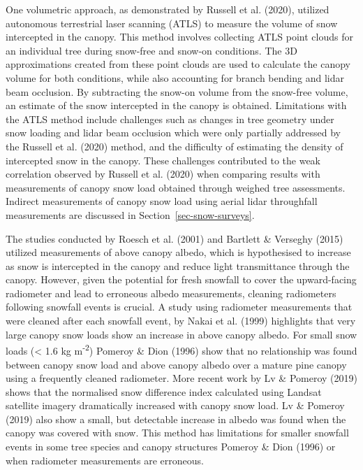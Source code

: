 \documentclass[
  letterpaper,
]{tex/uofsthesis-cs}
\begin{document}
One volumetric approach, as demonstrated by Russell et al. (2020),
utilized autonomous terrestrial laser scanning (ATLS) to measure the
volume of snow intercepted in the canopy. This method involves
collecting ATLS point clouds for an individual tree during snow-free and
snow-on conditions. The 3D approximations created from these point
clouds are used to calculate the canopy volume for both conditions,
while also accounting for branch bending and lidar beam occlusion. By
subtracting the snow-on volume from the snow-free volume, an estimate of
the snow intercepted in the canopy is obtained. Limitations with the
ATLS method include challenges such as changes in tree geometry under
snow loading and lidar beam occlusion which were only partially
addressed by the Russell et al. (2020) method, and the difficulty of
estimating the density of intercepted snow in the canopy. These
challenges contributed to the weak correlation observed by Russell et
al. (2020) when comparing results with measurements of canopy snow load
obtained through weighed tree assessments. Indirect measurements of
canopy snow load using aerial lidar throughfall measurements are
discussed in Section~\ref{sec-snow-surveys}.

The studies conducted by Roesch et al. (2001) and Bartlett \& Verseghy
(2015) utilized measurements of above canopy albedo, which is
hypothesised to increase as snow is intercepted in the canopy and reduce
light transmittance through the canopy. However, given the potential for
fresh snowfall to cover the upward-facing radiometer and lead to
erroneous albedo measurements, cleaning radiometers following snowfall
events is crucial. A study using radiometer measurements that were
cleaned after each snowfall event, by Nakai et al. (1999) highlights
that very large canopy snow loads show an increase in above canopy
albedo. For small snow loads (\textless{} 1.6 kg m\textsuperscript{-2})
Pomeroy \& Dion (1996) show that no relationship was found between
canopy snow load and above canopy albedo over a mature pine canopy using
a frequently cleaned radiometer. More recent work by Lv \& Pomeroy
(2019) shows that the normalised snow difference index calculated using
Landsat satellite imagery dramatically increased with canopy snow load.
Lv \& Pomeroy (2019) also show a small, but detectable increase in
albedo was found when the canopy was covered with snow. This method has
limitations for smaller snowfall events in some tree species and canopy
structures Pomeroy \& Dion (1996) or when radiometer measurements are
erroneous.
\end{document}

